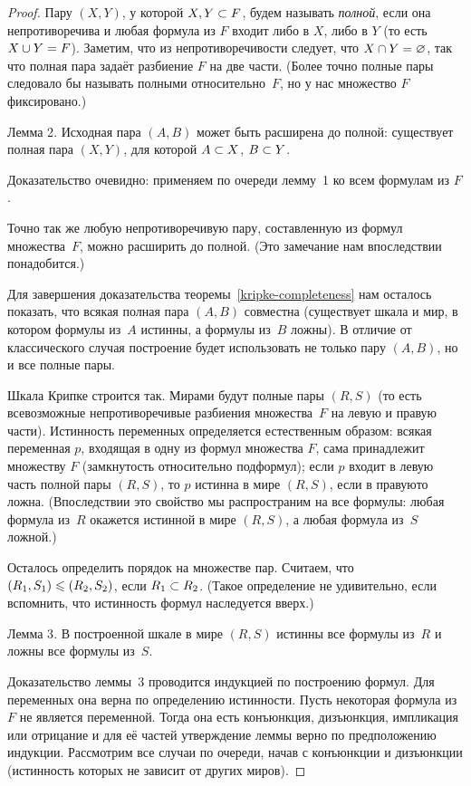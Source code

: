 \begin{proof}
Пару $(X,Y)$, у которой $X,Y\hm\subset F$, будем называть
\emph{полной},%
%
если она непротиворечива и любая формула из $F$
входит либо в $X$, либо в $Y$ (то есть $X\hm\cup Y\hm=F$).
Заметим, что из непротиворечивости следует, что $X\hm\cap
Y\hm=\varnothing$, так что полная пара задаёт разбиение $F$ на
две части. (Более точно полные пары следовало бы называть
 полными относительно~$F$, но у нас множество $F$ фиксировано.)

\textsf{Лемма 2}. Исходная пара $(A,B)$ может быть расширена до
полной: существует полная пара $(X,Y)$, для которой $A\hm\subset
X$, $B\hm\subset Y$.

Доказательство очевидно: применяем по очереди лемму~1 ко всем
формулам из $F$.

Точно так же любую непротиворечивую пару, составленную из
формул множества~$F$, можно расширить до полной. (Это замечание
нам впоследствии понадобится.)

Для завершения доказательства теоремы~\ref{kripke-completeness}
нам осталось показать, что всякая полная пара $(A,B)$ совместна
(существует шкала и мир, в котором формулы из~$A$ истинны, а
формулы из~$B$ ложны). В отличие от классического случая построение
будет использовать не только пару $(A,B)$, но и все полные пары.

Шкала Крипке строится так. Мирами будут полные пары $(R,S)$ (то
есть всевозможные непротиворечивые разбиения множества~$F$ на
левую и правую части). Истинность переменных определяется
естественным образом: всякая переменная $p$, входящая в одну из
формул множества $F$, сама принадлежит множеству $F$
(замкнутость относительно подформул); если $p$ входит в левую
часть полной пары $(R,S)$, то $p$ истинна в мире $(R,S)$, если в
правую\т то ложна. (Впоследствии это свойство мы распространим
на все формулы: любая формула из~$R$ окажется истинной в мире
$(R,S)$, а любая формула из~$S$\т ложной.)

Осталось определить порядок на множестве пар. Считаем, что
$(R_1,S_1)\hm\le(R_2,S_2)$, если $R_1\hm\subset R_2$. (Такое
определение не удивительно, если вспомнить, что истинность
формул наследуется вверх.)

\textsf{Лемма 3}. В построенной шкале в мире $(R,S)$ истинны все
формулы из~$R$ и ложны все формулы из~$S$.

Доказательство леммы~3 проводится индукцией по построению
формул. Для переменных она верна по определению истинности.
Пусть некоторая формула из $F$ не является переменной. Тогда
она есть конъюнкция, дизъюнкция, импликация или отрицание
и для её частей утверждение леммы верно по предположению
индукции. Рассмотрим все случаи по очереди, начав с конъюнкции
и дизъюнкции (истинность которых не зависит от других миров).


\end{proof}
